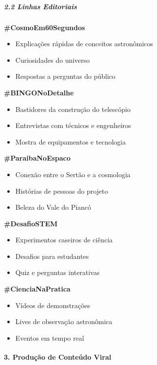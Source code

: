 \bigskip

\subparagraph{2.2 Linhas Editoriais}

\textbf{\#CosmoEm60Segundos}

\begin{itemize}
\item Explicações rápidas de conceitos astronômicos
\item Curiosidades do universo
\item Respostas a perguntas do público
\end{itemize}

\textbf{\#BINGONoDetalhe}

\begin{itemize}
\item Bastidores da construção do telescópio
\item Entrevistas com técnicos e engenheiros
\item Mostra de equipamentos e tecnologia
\end{itemize}

\textbf{\#ParaibaNoEspaco}

\begin{itemize}
\item Conexão entre o Sertão e a cosmologia
\item Histórias de pessoas do projeto
\item Beleza do Vale do Piancó
\end{itemize}

\textbf{\#DesafioSTEM}

\begin{itemize}
\item Experimentos caseiros de ciência
\item Desafios para estudantes
\item Quiz e perguntas interativas
\end{itemize}

\textbf{\#CienciaNaPratica}

\begin{itemize}
\item Vídeos de demonstrações
\item Lives de observação astronômica
\item Eventos em tempo real
\end{itemize}

\paragraph{3. Produção de Conteúdo Viral}

